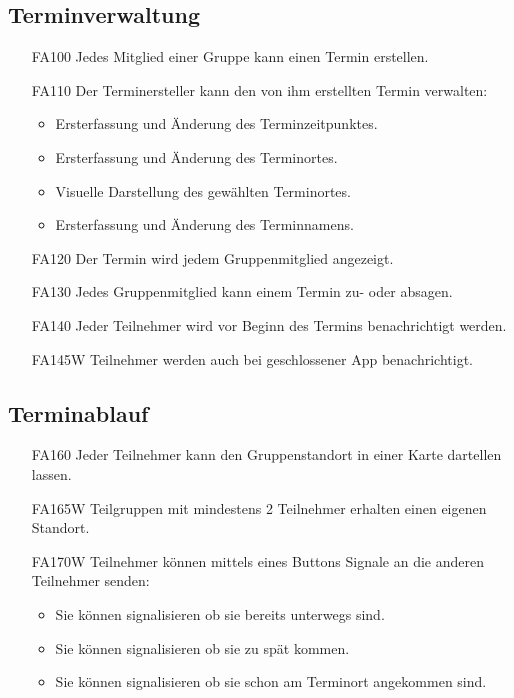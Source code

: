 \documentclass{scrartcl}
\begin{document}
	\subsection{Terminverwaltung}
	\begin{itemize}
		\item[FA100] Jedes Mitglied einer Gruppe kann einen Termin erstellen.
		\item[FA110] Der Terminersteller kann den von ihm erstellten Termin verwalten:
		\begin{itemize}
			\item Ersterfassung und Änderung des Terminzeitpunktes.
		\end{itemize}
		\begin{itemize}
			\item Ersterfassung und Änderung des Terminortes.
			\item Visuelle Darstellung des gewählten Terminortes. 
		\end{itemize}
		\begin{itemize}
			\item Ersterfassung und Änderung des Terminnamens.
		\end{itemize}
		
		\item[FA120] Der Termin wird jedem Gruppenmitglied angezeigt.
		\item[FA130] Jedes Gruppenmitglied kann einem Termin zu- oder absagen.
		\item[FA140] Jeder Teilnehmer wird vor Beginn des Termins benachrichtigt werden.
		\item[FA145W] Teilnehmer werden auch bei geschlossener App benachrichtigt.
		
		
	\end{itemize}
	
	\subsection{Terminablauf}
	\begin{itemize}
		\item[FA160] Jeder Teilnehmer kann den Gruppenstandort in einer Karte dartellen lassen.
		\item[FA165W] Teilgruppen mit mindestens 2 Teilnehmer erhalten einen eigenen Standort. 
		\item[FA170W] Teilnehmer können mittels eines Buttons Signale an die anderen Teilnehmer senden:
		\begin{itemize}
			\item Sie können signalisieren ob sie bereits unterwegs sind.
			\item Sie können signalisieren ob sie zu spät kommen.
			\item Sie können signalisieren ob sie schon am Terminort angekommen sind.
		\end{itemize}
	\end{itemize}
		
\end{document}
